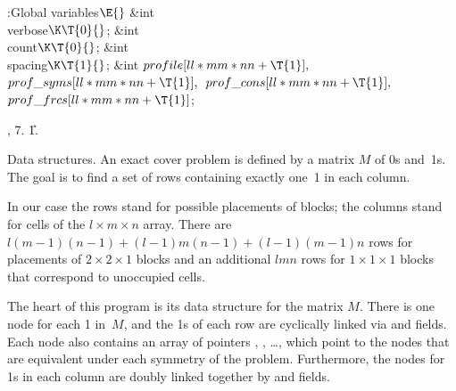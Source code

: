 \B{}:Global variables\X${}\E{}$\6
\&{int} \\{verbose}${}\K\T{0}{}$;\6
\&{int} \\{count}${}\K\T{0}{}$;\6
\&{int} \\{spacing}${}\K\T{1}{}$;\6
\&{int} ${}\\{profile}[\\{ll}*\\{mm}*\\{nn}+\T{1}],{}$ ${}\\{prof\_syms}[%
\\{ll}*\\{mm}*\\{nn}+\T{1}],{}$ ${}\\{prof\_cons}[\\{ll}*\\{mm}*\\{nn}+%
\T{1}],{}$ ${}\\{prof\_frcs}[\\{ll}*\\{mm}*\\{nn}+\T{1}]{}$;\par
{}, 7.
\U1.\fi

Data structures. An exact cover problem is defined by a matrix $M$ of
0s
and~1s. The goal is to find a set of rows containing exactly one~1 in each
column.

In our case the rows stand for possible placements of blocks; the
columns stand for cells of the $l\times m\times n$ array. There are
$l(m-1)(n-1)+(l-1)m(n-1)+(l-1)(m-1)n$ rows for placements of $2\times2\times1$
blocks and an additional $lmn$ rows for $1\times1\times1$ blocks that
correspond to unoccupied cells.

The heart of this program is its data structure for the matrix $M$. There is
one node for each 1 in~$M$, and the 1s of each row are cyclically linked via
 and  fields. Each node also contains an array of
pointers
, , \dots, which point to the nodes that
are equivalent under
each symmetry of the problem. Furthermore, the nodes for 1s in each column are
doubly linked together by  and  fields.


